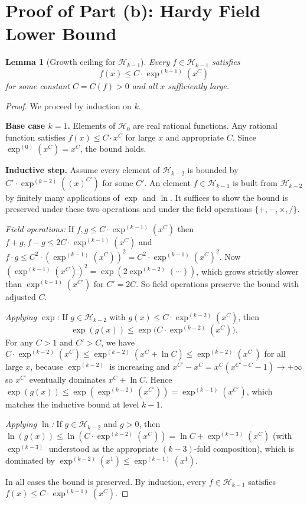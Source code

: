 \documentclass[12pt,a4paper]{article}
\newtheorem{lemma}[theorem]{Lemma}
\theoremstyle{definition}
\theoremstyle{remark}
\begin{document}
\section{Proof of Part (b): Hardy Field Lower Bound}\label{sec:hardy}

\begin{lemma}[Growth ceiling for $\mathcal{H}_{k-1}$]\label{lem:growthcap}
Every $f\in\mathcal{H}_{k-1}$ satisfies
\[
  f(x) \leq C\cdot\exp^{(k-1)}(x^C)
\]
for some constant $C=C(f)>0$ and all $x$ sufficiently large.
\end{lemma}

\begin{proof}
We proceed by induction on $k$.

\textbf{Base case $k=1$.}  Elements of $\mathcal{H}_0$ are real rational
functions.  Any rational function satisfies $f(x)\leq C\cdot x^C$ for
large $x$ and appropriate $C$.  Since $\exp^{(0)}(x^C)=x^C$, the bound holds.

\textbf{Inductive step.}  Assume every element of $\mathcal{H}_{k-2}$ is
bounded by $C'\cdot\exp^{(k-2)}((x)^{C'})$ for some $C'$.  An element
$f\in\mathcal{H}_{k-1}$ is built from $\mathcal{H}_{k-2}$ by finitely many
applications of $\exp$ and $\ln$.  It suffices to show the bound is preserved
under these two operations and under the field operations $\{+,-,\times,/\}$.

\emph{Field operations:} If $f,g\leq C\cdot\exp^{(k-1)}(x^C)$ then
$f+g, f-g\leq 2C\cdot\exp^{(k-1)}(x^C)$ and
$f\cdot g\leq C^2\cdot(\exp^{(k-1)}(x^C))^2=C^2\cdot\exp^{(k-1)}(x^C)^2$.
Now $(\exp^{(k-1)}(x^C))^2=\exp(2\exp^{(k-2)}(\cdots))$, which grows strictly
slower than $\exp^{(k-1)}(x^{C'})$ for $C'=2C$.  So field operations preserve
the bound with adjusted $C$.

\emph{Applying $\exp$:} If $g\in\mathcal{H}_{k-2}$ with
$g(x)\leq C\cdot\exp^{(k-2)}(x^C)$, then
\[
  \exp(g(x)) \leq \exp\!\bigl(C\cdot\exp^{(k-2)}(x^C)\bigr).
\]
For any $C>1$ and $C'>C$, we have $C\cdot\exp^{(k-2)}(x^C)
\leq\exp^{(k-2)}(x^C+\ln C)\leq\exp^{(k-2)}(x^{C'})$ for all large $x$,
because $\exp^{(k-2)}$ is increasing and $x^{C'}-x^C=x^C(x^{C'-C}-1)\to+\infty$
so $x^{C'}$ eventually dominates $x^C+\ln C$.  Hence
$\exp(g(x))\leq\exp(\exp^{(k-2)}(x^{C'}))=\exp^{(k-1)}(x^{C'})$,
which matches the inductive bound at level $k-1$.

\emph{Applying $\ln$:} If $g\in\mathcal{H}_{k-2}$ and $g>0$, then
$\ln(g(x))\leq\ln(C\cdot\exp^{(k-2)}(x^C))=\ln C+\exp^{(k-3)}(x^C)$
(with $\exp^{(k-3)}$ understood as the appropriate $(k-3)$-fold composition),
which is dominated by $\exp^{(k-2)}(x^1)\leq\exp^{(k-1)}(x^1)$.

In all cases the bound is preserved.  By induction, every
$f\in\mathcal{H}_{k-1}$ satisfies $f(x)\leq C\cdot\exp^{(k-1)}(x^C)$.
\end{proof}
\end{document}
